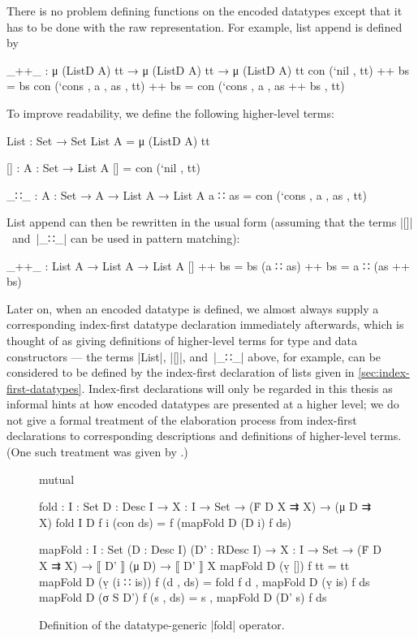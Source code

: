 
There is no problem defining functions on the encoded datatypes except that it has to be done with the raw representation.
For example, list append is defined by
\begin{code}
_++_ : μ (ListD A) tt → μ (ListD A) tt → μ (ListD A) tt
con (`nil   ,           tt) ++ bs = bs
con (`cons  , a , as ,  tt) ++ bs = con (`cons , a , as ++ bs , tt)
\end{code}
To improve readability, we define the following higher-level terms:
\begin{code}
List : Set → Set
List A = μ (ListD A) tt

[] : {A : Set} → List A
[] = con (`nil , tt)

_∷_ : {A : Set} → A → List A → List A
a ∷ as = con (`cons  , a , as ,  tt)
\end{code}
List append can then be rewritten in the usual form (assuming that the terms |[]|~and~|_∷_| can be used in pattern matching):
\begin{code}
_++_ : List A → List A → List A
[]        ++ bs = bs
(a ∷ as)  ++ bs = a ∷ (as ++ bs)
\end{code}
Later on, when an encoded datatype is defined, we almost always supply a corresponding index-first datatype declaration immediately afterwards, which is thought of as giving definitions of higher-level terms for type and data constructors --- the terms |List|, |[]|, and~|_∷_| above, for example, can be considered to be defined by the index-first declaration of lists given in \autoref{sec:index-first-datatypes}.
Index-first declarations will only be regarded in this thesis as informal hints at how encoded datatypes are presented at a higher level; we do not give a formal treatment of the elaboration process from index-first declarations to corresponding descriptions and definitions of higher-level terms.
(One such treatment was given by \citet{Dagand-elaboration}.)

\begin{figure}
\codefigure
\begin{code}
mutual

  fold :  {I : Set} {D : Desc I} →
          {X : I → Set} → (Ḟ D X ⇉ X) → (μ D ⇉ X)
  fold {I} {D} f {i} (con ds) = f (mapFold D (D i) f ds)

  mapFold :  {I : Set} (D : Desc I) (D' : RDesc I) →
             {X : I → Set} → (Ḟ D X ⇉ X) → ⟦ D' ⟧ (μ D) → ⟦ D' ⟧ X
  mapFold D (ṿ [])        f tt         = tt
  mapFold D (ṿ (i ∷ is))  f (d  , ds)  = fold f d , mapFold D (ṿ is) f ds
  mapFold D (σ S D')      f (s  , ds)  = s , mapFold D (D' s) f ds
\end{code}
\caption{Definition of the datatype-generic |fold| operator.}
\label{fig:fold}
\end{figure}

